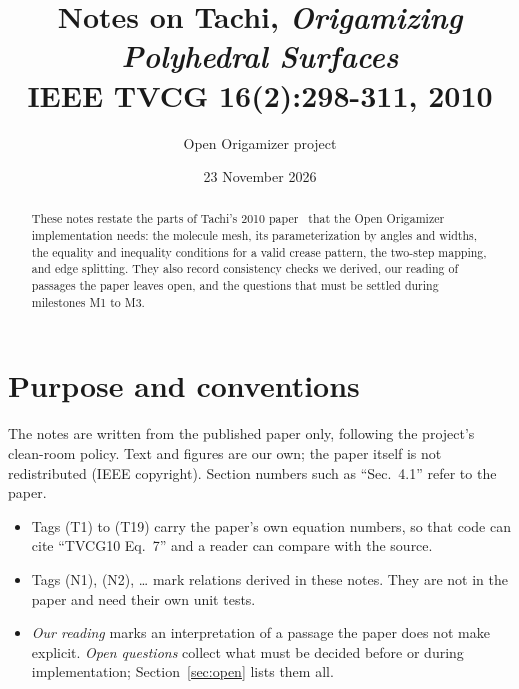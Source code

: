 \documentclass[11pt]{article}
\title{Notes on Tachi, \emph{Origamizing Polyhedral Surfaces}\\
  \large IEEE TVCG 16(2):298-311, 2010}
\author{Open Origamizer project}
\date{23 November 2026}
\theoremstyle{definition}
\begin{document}
\maketitle

\begin{abstract}
These notes restate the parts of Tachi's 2010 paper~\cite{tvcg10} that the Open
Origamizer implementation needs: the molecule mesh, its parameterization by
angles and widths, the equality and inequality conditions for a valid crease
pattern, the two-step mapping, and edge splitting. They also record
consistency checks we derived, our reading of passages the paper leaves open,
and the questions that must be settled during milestones M1 to M3.
\end{abstract}

\section{Purpose and conventions}

The notes are written from the published paper only, following the project's
clean-room policy. Text and figures are our own; the paper itself is not
redistributed (IEEE copyright). Section numbers such as ``Sec.~4.1'' refer to
the paper.

\begin{itemize}[nosep]
  \item Tags \textup{(T1)} to \textup{(T19)} carry the paper's own equation
    numbers, so that code can cite ``TVCG10 Eq.~7'' and a reader can compare
    with the source.
  \item Tags \textup{(N1)}, \textup{(N2)}, \dots{} mark relations derived in
    these notes. They are not in the paper and need their own unit tests.
  \item \emph{Our reading} marks an interpretation of a passage the paper does
    not make explicit. \emph{Open questions} collect what must be decided
    before or during implementation; Section~\ref{sec:open} lists them all.
\end{itemize}
\end{document}

